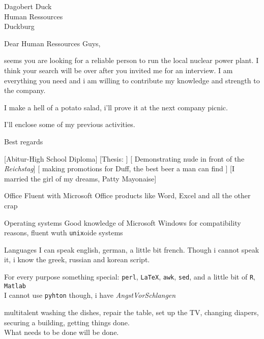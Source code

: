 \documentclass[x11names,parskip=half,american]{bewerbung}
\newcommand{\lang}[1]{\texttt{#1}}
\begin{document}
\begin{letter}{Dagobert Duck\\
		Human Ressources\\
	Duckburg}
	\opening{Dear Human Ressources Guys,}

	seems you are looking for a reliable person to run the
	local nuclear power plant. I think your search will be
	over after you invited me for an interview. I am
	 everything you need and i am willing to contribute my
	knowledge and strength to the company. 

	I make a hell of a potato salad, i'll prove it at
	the next company picnic.

	I'll enclose some of my previous activities.

	\closing{Best regards}
\end{letter}


\cvsymbols
\begin{cv}
	[Abitur-High School
	Diploma]
	[Thesis: ]
	[ Demonstrating nude in
	front of the \emph{Reichstag}]
	[ making promotions for Duff, the best beer a man can find ]
	[I married the
	girl of my dreams, Patty Mayonaise]
	\begin{cvlist}
	\item [Office] Fluent with Microsoft Office products like
		Word, Excel and all the other crap
	\item [Operating systems] Good knowledge of Microsoft
		Windows for compatibility reasons, fluent wuth
		\texttt{unix}oide systems
	\item [Languages] I can speak english, german, a little
		bit french. Though i cannot speak it, i know the
		greek, russian and korean script. 
	\item [\faCode] For every purpose something special:
		\lang{perl}, \lang{LaTeX}, \lang{awk}, \lang{sed},
		and a little bit of \lang{R}, \lang{Matlab}
		\\I cannot use \lang{pyhton} though, i have
		\emph{AngstVorSchlangen}
	\item [multitalent] washing the dishes, repair the table,
		set up the TV, changing diapers, securing a
		building, getting things done.\\ What needs to be done will be done. 
	\end{cvlist}
	\nocite{*}
	\printbibliography[heading=cvRef]
\end{cv}
\end{document}
